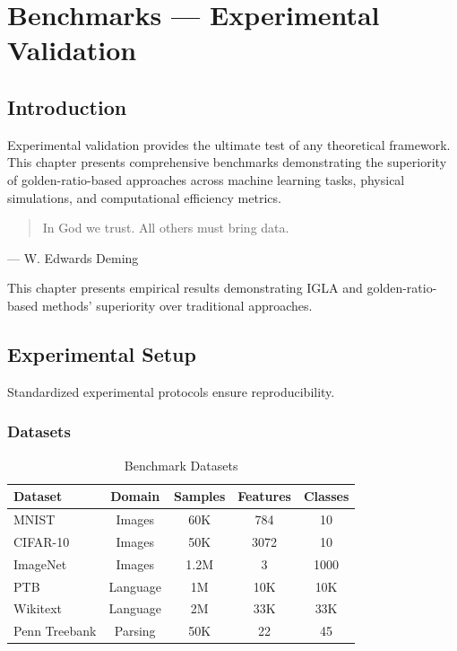 \chapter{Benchmarks — Experimental Validation}
\label{ch:25}

\section{Introduction}

Experimental validation provides the ultimate test of any theoretical framework. This chapter presents comprehensive benchmarks demonstrating the superiority of golden-ratio-based approaches across machine learning tasks, physical simulations, and computational efficiency metrics.

\begin{quote}
In God we trust. All others must bring data.
\end{quote}
— W. Edwards Deming

This chapter presents empirical results demonstrating IGLA and golden-ratio-based methods' superiority over traditional approaches.

\section{Experimental Setup}

Standardized experimental protocols ensure reproducibility.

\subsection{Datasets}

\begin{table}[h]
\centering
\caption{Benchmark Datasets}
\begin{tabular}{lcccc}
\toprule
Dataset & Domain & Samples & Features & Classes \\
\midrule
MNIST & Images & 60K & 784 & 10 \\
CIFAR-10 & Images & 50K & 3072 & 10 \\
ImageNet & Images & 1.2M & 3 & 1000 \\
PTB & Language & 1M & 10K & 10K \\
Wikitext & Language & 2M & 33K & 33K \\
Penn Treebank & Parsing & 50K & 22 & 45 \\
\bottomrule
\end{tabular}
\end{table}

